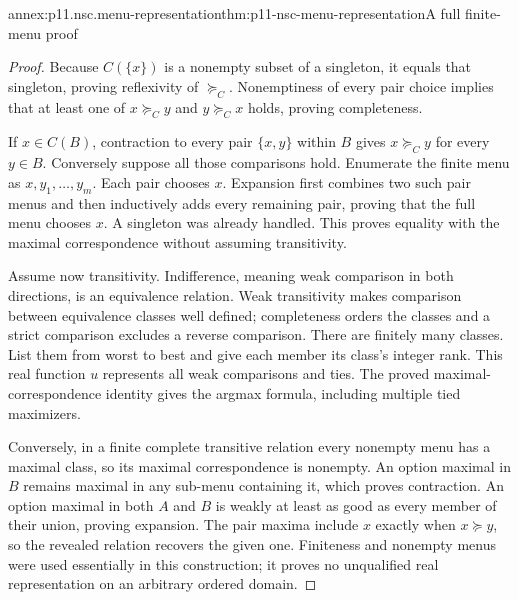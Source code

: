 \begin{annexitem}{annex:p11.nsc.menu-representation}{thm:p11-nsc-menu-representation}{A full finite-menu proof}
\begin{proof}
Because \(C(\{x\})\) is a nonempty subset of a singleton, it equals
that singleton, proving reflexivity of \(\succeq_C\). Nonemptiness
of every pair choice implies that at least one of \(x\succeq_C y\)
and \(y\succeq_C x\) holds, proving completeness.

If \(x\in C(B)\), contraction to every pair \(\{x,y\}\) within
\(B\) gives \(x\succeq_C y\) for every \(y\in B\).
Conversely suppose all those comparisons hold. Enumerate the finite menu
as \(x,y_1,\ldots,y_m\). Each pair chooses \(x\). Expansion first
combines two such pair menus and then inductively adds every remaining
pair, proving that the full menu chooses \(x\). A singleton was already
handled. This proves equality with the maximal correspondence without
assuming transitivity.

Assume now transitivity. Indifference, meaning weak comparison in both
directions, is an equivalence relation. Weak transitivity makes comparison
between equivalence classes well defined; completeness orders the classes
and a strict comparison excludes a reverse comparison. There are finitely
many classes. List them from worst to best and give each member its class's
integer rank. This real function \(u\) represents all weak comparisons
and ties. The proved maximal-correspondence identity gives the argmax
formula, including multiple tied maximizers.

Conversely, in a finite complete transitive relation every nonempty menu
has a maximal class, so its maximal correspondence is nonempty. An option
maximal in \(B\) remains maximal in any sub-menu containing it, which
proves contraction. An option maximal in both \(A\) and \(B\) is
weakly at least as good as every member of their union, proving expansion.
The pair maxima include \(x\) exactly when \(x\succeq y\), so
the revealed relation recovers the given one. Finiteness and nonempty
menus were used essentially in this construction; it proves no unqualified
real representation on an arbitrary ordered domain.
\end{proof}
\end{annexitem}


